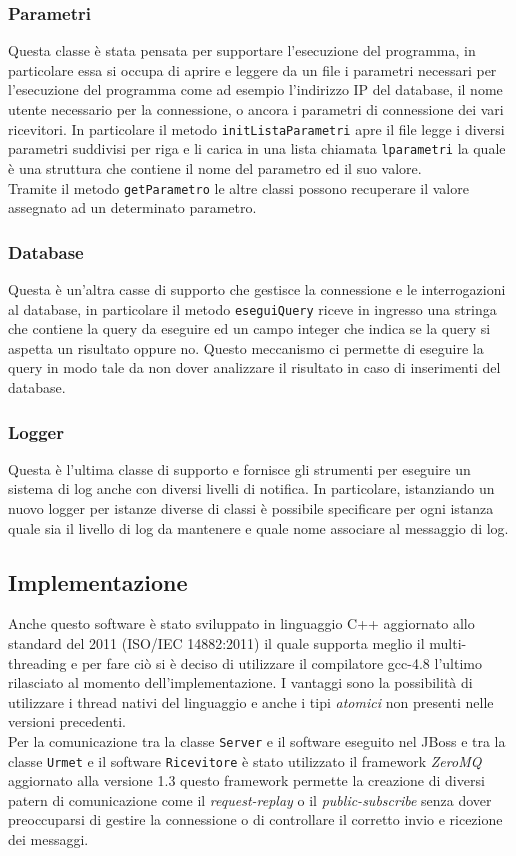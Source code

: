 \subsubsection{Parametri}
Questa classe è stata pensata per supportare l'esecuzione del programma, in particolare essa si occupa di aprire e leggere da un file i parametri necessari per l'esecuzione del programma come ad esempio l'indirizzo IP del database, il nome utente necessario per la connessione, o ancora i parametri di connessione dei vari ricevitori. In particolare il metodo \texttt{initListaParametri} apre il file legge i diversi parametri suddivisi per riga e li carica in una lista chiamata \texttt{lparametri} la quale è una struttura che contiene il nome del parametro ed il suo valore.\\
Tramite il metodo \texttt{getParametro} le altre classi possono recuperare il valore assegnato ad un determinato parametro.
\subsubsection{Database}
Questa è un'altra casse di supporto che gestisce la connessione e le interrogazioni al database, in particolare il metodo \texttt{eseguiQuery} riceve in ingresso una stringa che contiene la query da eseguire ed un campo integer che indica se la query si aspetta un risultato oppure no. Questo meccanismo ci permette di eseguire la query in modo tale da non dover analizzare il risultato in caso di inserimenti del database.
\subsubsection{Logger}
Questa è l'ultima classe di supporto e fornisce gli strumenti per eseguire un sistema di log anche con diversi livelli di notifica. In particolare, istanziando un nuovo logger per istanze diverse di classi è possibile specificare per ogni istanza quale sia il livello di log da mantenere e quale nome associare al messaggio di log.
\subsection{Implementazione}
Anche questo software è stato sviluppato in linguaggio C++ aggiornato allo standard del 2011 (ISO/IEC 14882:2011\cite{c++11}) il quale supporta meglio il multi-threading e per fare ciò si è deciso di utilizzare il compilatore gcc-4.8 l'ultimo rilasciato al momento dell'implementazione. I vantaggi sono la possibilità di utilizzare i thread nativi del linguaggio e anche i tipi \emph{atomici} non presenti nelle versioni precedenti.\\
Per la comunicazione tra la classe \texttt{Server} e il software eseguito nel JBoss e tra la classe \texttt{Urmet} e il software \texttt{Ricevitore} è stato utilizzato il framework \emph{ZeroMQ}\cite{zmq} aggiornato alla versione 1.3 questo framework permette la creazione di diversi patern di comunicazione come il \emph{request-replay} o il \emph{public-subscribe} senza dover preoccuparsi di gestire la connessione o di controllare il corretto invio e ricezione dei messaggi.
